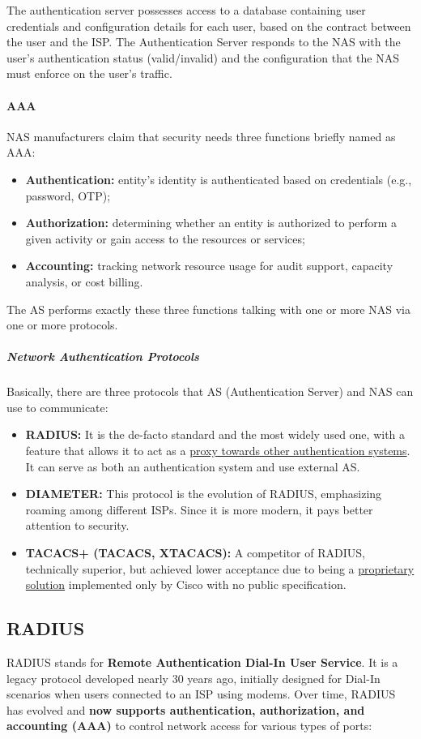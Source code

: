 The authentication server possesses access to a database containing user credentials and configuration details for each user, based on the contract between the user and the ISP. The Authentication Server responds to the NAS with the user's authentication status (valid/invalid) and the configuration that the NAS must enforce on the user's traffic.

\paragraph{AAA}
NAS manufacturers claim that security needs three functions briefly named as AAA:
\begin{itemize}
	\item \textbf{Authentication:} entity's identity is authenticated based on credentials (e.g., password, OTP);
	\item \textbf{Authorization:} determining whether an entity is authorized to perform a given activity or gain access to the resources or services;
	\item \textbf{Accounting:} tracking network resource usage for audit support, capacity analysis, or cost billing.
\end{itemize}

The AS performs exactly these three functions talking with one or more NAS via one or more protocols.

\subparagraph{Network Authentication Protocols}
Basically, there are three protocols that AS (Authentication Server) and NAS can use to communicate:
\begin{itemize}
	\item \textbf{RADIUS:} It is the de-facto standard and the most widely used one, with a feature that allows it to act as a \underline{proxy towards other authentication systems}. It can serve as both an authentication system and use external AS.
	\item \textbf{DIAMETER:} This protocol is the evolution of RADIUS, emphasizing roaming among different ISPs. Since it is more modern, it pays better attention to security.
	\item \textbf{TACACS+ (TACACS, XTACACS):} A competitor of RADIUS, technically superior, but achieved lower acceptance due to being a \underline{proprietary solution} implemented only by Cisco with no public specification.
\end{itemize}


\subsection{RADIUS}\label{chap:radius}
RADIUS stands for \textbf{Remote Authentication Dial-In User Service}. It is a legacy protocol developed nearly 30 years ago, initially designed for Dial-In scenarios when users connected to an ISP using modems. Over time, RADIUS has evolved and \textbf{now supports authentication, authorization, and accounting (AAA)} to control network access for various types of ports:

